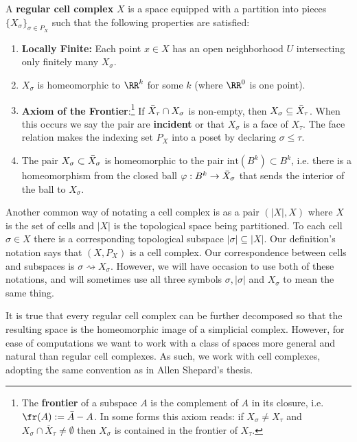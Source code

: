 \begin{defn}
	A {\bf regular cell complex} $X$ is a space equipped with a partition into pieces $\{X_{\sigma}\}_{\sigma\in P_X}$ such that the following properties are satisfied:
	\begin{enumerate}
		\item {\bf Locally Finite:} Each point $x\in X$ has an open neighborhood $U$ intersecting only finitely many $X_{\sigma}$.
		\item $X_{\sigma}$ is homeomorphic to $\RR^k$ for some $k$ (where $\RR^0$ is one point).
		\item {\bf Axiom of the Frontier}:\footnote{The \textbf{frontier} of a subspace $A$ is the complement of $A$ in its closure, i.e. $\fr(A):=\bar{A}-A$. In some forms this axiom reads: if $X_{\sigma}\neq X_{\tau}$ and $X_{\sigma}\cap\bar{X}_{\tau}\neq\emptyset$ then $X_{\sigma}$ is contained in the frontier of $X_{\tau}$.} If $\Bar{X}_{\tau}\cap X_{\sigma}$ is non-empty, then $X_{\sigma}\subseteq \Bar{X}_{\tau}$. When this occurs we say the pair are \textbf{incident} or that $X_{\sigma}$ is a face of $X_{\tau}$. The face relation makes the indexing set $P_X$ into a poset by declaring $\sigma\leq \tau$.
		\item The pair $X_{\sigma}\subset \Bar{X}_{\sigma}$ is homeomorphic to the pair $\mathrm{int}(B^{k})\subset B^k$, i.e. there is a homeomorphism from the closed ball $\varphi:B^k\to \Bar{X}_{\sigma}$ that sends the interior of the ball to $X_{\sigma}$.
	\end{enumerate}
\end{defn}

\begin{rmk}[Notation]
	Another common way of notating a cell complex is as a pair $(|X|,X)$ where $X$ is the set of cells and $|X|$ is the topological space being partitioned. To each cell $\sigma\in X$ there is a corresponding topological subspace $|\sigma|\subseteq |X|$. Our definition's notation says that $(X,P_X)$ is a cell complex. Our correspondence between cells and subspaces is $\sigma\rightsquigarrow X_{\sigma}$. However, we will have occasion to use both of these notations, and will sometimes use all three symbols $\sigma, |\sigma|$ and $X_{\sigma}$ to mean the same thing.
\end{rmk}

It is true that every regular cell complex can be further decomposed so that the resulting space is the homeomorphic image of a simplicial complex. However, for ease of computations we want to work with a class of spaces more general and natural than regular cell complexes. As such, we work with cell complexes, adopting the same convention as in Allen Shepard's thesis.

